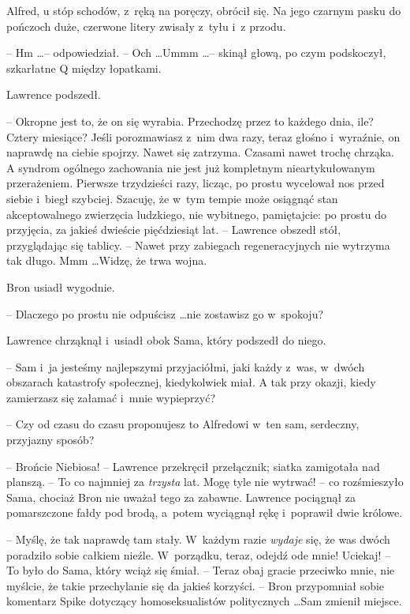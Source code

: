 \documentclass[oneside,polish,11pt,rmheadings]{mwbk}
\begin{document}
Alfred, u stóp schodów, z~ręką na poręczy, obrócił się. Na jego czarnym pasku do pończoch duże, czerwone litery zwisały z~tyłu i~z przodu. 

-- Hm \ldots  -- odpowiedział. -- Och \ldots  Ummm \ldots  -- skinął głową, po czym podskoczył, szkarłatne Q między łopatkami. 

Lawrence podszedł. 

-- Okropne jest to, że on się wyrabia. Przechodzę przez to każdego dnia, ile? Cztery miesiące? Jeśli porozmawiasz z~nim dwa razy, teraz głośno i~wyraźnie, on naprawdę na ciebie spojrzy. Nawet się zatrzyma. Czasami nawet trochę chrząka. A syndrom ogólnego zachowania nie jest już kompletnym nieartykułowanym przerażeniem. Pierwsze trzydzieści razy, licząc, po prostu wycelował nos przed siebie i~biegł szybciej. Szacuję, że w~tym tempie może osiągnąć stan akceptowalnego zwierzęcia ludzkiego, nie wybitnego, pamiętajcie: po prostu do przyjęcia, za jakieś dwieście pięćdziesiąt lat. -- Lawrence obszedł stół, przyglądając się tablicy. -- Nawet przy zabiegach regeneracyjnych nie wytrzyma tak długo. Mmm \ldots  Widzę, że trwa wojna. 

Bron usiadł wygodnie. 

-- Dlaczego po prostu nie odpuścisz \ldots  nie zostawisz go w~spokoju? 

Lawrence chrząknął i~usiadł obok Sama, który podszedł do niego. 

-- Sam i~ja jesteśmy najlepszymi przyjaciółmi, jaki każdy z~was, w~dwóch obszarach katastrofy społecznej, kiedykolwiek miał. A tak przy okazji, kiedy zamierzasz się załamać i~mnie wypieprzyć? 

-- Czy od czasu do czasu proponujesz to Alfredowi w~ten sam, serdeczny, przyjazny sposób? 

-- Brońcie Niebiosa! -- Lawrence przekręcił przełącznik; siatka zamigotała nad planszą. -- To co najmniej za \textit{trzysta } lat. Mogę tyle nie wytrwać! -- co rozśmieszyło Sama, chociaż Bron nie uważał tego za zabawne. Lawrence pociągnął za pomarszczone fałdy pod brodą, a~potem wyciągnął rękę i~poprawił dwie królowe. 

-- Myślę, że tak naprawdę tam stały. W~każdym razie \textit{wydaje }się, że was dwóch poradziło sobie całkiem nieźle. W~porządku, teraz, odejdź ode mnie!  Uciekaj! -- To było do Sama, który wciąż się śmiał. -- Teraz obaj gracie przeciwko mnie, nie myślcie, że takie przechylanie się da jakieś korzyści. -- Bron przypomniał sobie komentarz Spike dotyczący homoseksualistów politycznych \ldots  Sam zmienił miejsce. 
\end{document}

